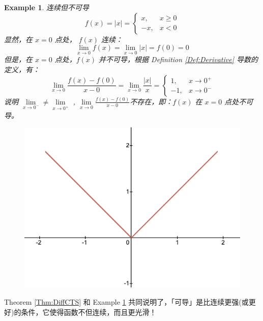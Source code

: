 \documentclass{ctexart}
\numberwithin{equation}{section}
\numberwithin{figure}{section}
\newtheorem{myEx}{Example}[section] %
\begin{document}
\begin{myEx}\label{Ex:CTSNotDiff}
    连续但不可导
    \begin{equation*}
        f(x) = \left| x \right| =
        \begin{cases}
            x,  & x \geq 0 \\
            -x, & x < 0
        \end{cases}
    \end{equation*}
    显然，在 \(x = 0\) 点处， \(f(x)\) 连续：
    \begin{equation*}
        \lim\limits_{x\to 0} f(x)  = \lim\limits_{x\to 0} \left| x \right| = f(0) = 0
    \end{equation*}
    但是，在 \(x = 0\) 点处，\(f(x)\) 并不可导，根据 Definition \ref{Def:Derivative} 导数的定义，有：
    \begin{equation*}
        \lim\limits_{x\to 0}\frac{f(x) - f(0)}{x - 0} = \lim\limits_{x\to 0}\frac{\left| x \right|}{x} =
        \begin{cases}
            1,  & x \to 0^{+} \\
            -1, & x \to 0^{-}
        \end{cases}
    \end{equation*}
    说明 \(\lim\limits_{x\to 0^{-}} \neq \lim\limits_{x\to 0^{+}}\) , \(\lim\limits_{x\to 0}\frac{f(x) - f(0)}{x - 0}\)不存在，即：\(f(x)\) 在 \(x = 0\) 点处不可导。
    \begin{figure}[H]
        \centering
        \includegraphics[scale=0.4]{images/abs(x).png}
    \end{figure}
\end{myEx}
Theorem \ref{Thm:DiffCTS} 和 Example \ref{Ex:CTSNotDiff} 共同说明了，「可导」是比连续更强(或更好)的条件，它使得函数不但连续，而且更光滑！
\end{document}
